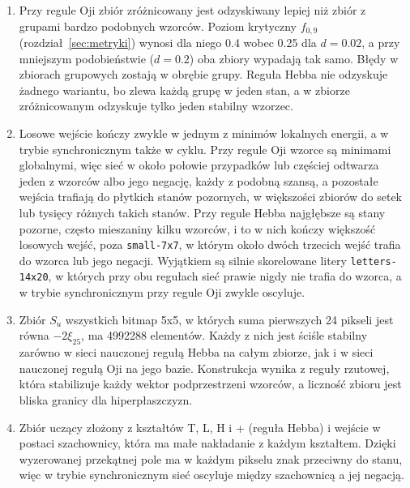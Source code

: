 \begin{enumerate}
    \item {}
    Przy regule Oji zbiór zróżnicowany jest odzyskiwany lepiej niż zbiór z grupami bardzo podobnych wzorców. Poziom krytyczny $f_{0,9}$ (rozdział~\ref{sec:metryki}) wynosi dla niego \num{0.4} wobec \num{0.25} dla $d = \num{0.02}$, a przy mniejszym podobieństwie ($d = \num{0.2}$) oba zbiory wypadają tak samo. Błędy w zbiorach grupowych zostają w obrębie grupy. Reguła Hebba nie odzyskuje żadnego wariantu, bo zlewa każdą grupę w jeden stan, a w zbiorze zróżnicowanym odzyskuje tylko jeden stabilny wzorzec.
    \item {}
    Losowe wejście kończy zwykle w jednym z minimów lokalnych energii, a w trybie synchronicznym także w cyklu. Przy regule Oji wzorce są minimami globalnymi, więc sieć w około połowie przypadków lub częściej odtwarza jeden z wzorców albo jego negację, każdy z podobną szansą, a pozostałe wejścia trafiają do płytkich stanów pozornych, w większości zbiorów do setek lub tysięcy różnych takich stanów. Przy regule Hebba najgłębsze są stany pozorne, często mieszaniny kilku wzorców, i to w nich kończy większość losowych wejść, poza \texttt{small-7x7}, w którym około dwóch trzecich wejść trafia do wzorca lub jego negacji. Wyjątkiem są silnie skorelowane litery \texttt{letters-14x20}, w których przy obu regułach sieć prawie nigdy nie trafia do wzorca, a w trybie synchronicznym przy regule Oji zwykle oscyluje.
    \item {}
    Zbiór $S_u$ wszystkich bitmap \mbox{5x5}, w których suma pierwszych 24 pikseli jest równa $-2 \xi_{25}$, ma \num{4992288} elementów. Każdy z nich jest ściśle stabilny zarówno w sieci nauczonej regułą Hebba na całym zbiorze, jak i w sieci nauczonej regułą Oji na jego bazie. Konstrukcja wynika z reguły rzutowej, która stabilizuje każdy wektor podprzestrzeni wzorców, a liczność zbioru jest bliska granicy dla hiperpłaszczyzn.
    \item {}
    Zbiór uczący złożony z kształtów T, L, H i + (reguła Hebba) i wejście w postaci szachownicy, która ma małe nakładanie z każdym kształtem. Dzięki wyzerowanej przekątnej pole ma w każdym pikselu znak przeciwny do stanu, więc w trybie synchronicznym sieć oscyluje między szachownicą a jej negacją.

\end{enumerate}
